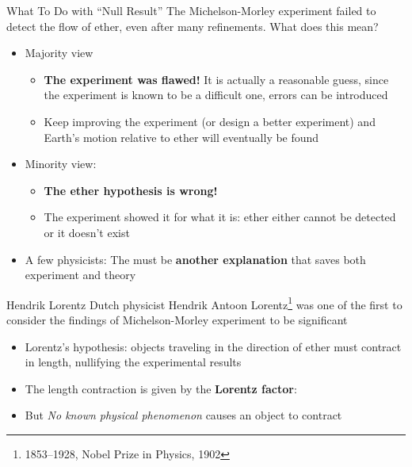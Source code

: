 \documentclass[12pt,compress,aspectratio=169]{beamer}
\newcommand{\pic}[2]{\texttt{[image: \#2]}}
\newcommand{\bigsqrt}{\ensuremath\sqrt{1-\left(\frac{v}{c}\right)^2}}
\newcommand{\lorentz}{\ensuremath\frac{1}{\bigsqrt}}
\newcommand{\eq}[2]{\vspace{#1}{\Large\begin{displaymath}#2\end{displaymath}}}
\begin{document}
\begin{frame}{What To Do with ``Null Result''}
  The Michelson-Morley experiment failed to detect the flow of ether, even
  after many refinements. What does this mean?
  \begin{itemize}
  \item Majority view
    \begin{itemize}
    \item\textbf{The experiment was flawed!} It is actually a reasonable
      guess, since the experiment is known to be a difficult one, errors can
      be introduced
    \item Keep improving the experiment (or design a better experiment) and
      Earth's motion relative to ether will eventually be found
    \end{itemize}
  \item Minority view:
    \begin{itemize}
    \item\textbf{The ether hypothesis is wrong!}
    \item The experiment showed it for what it is: ether either cannot be
      detected or it doesn't exist
    \end{itemize}
  \item A few physicists: The must be \textbf{another explanation} that saves
    both experiment and theory
  \end{itemize}
\end{frame}



\begin{frame}{Hendrik Lorentz}
%    
%    
  Dutch physicist Hendrik Antoon Lorentz\footnote{1853--1928, Nobel Prize in
    Physics, 1902} was one of the first to consider the findings of
  Michelson-Morley experiment to be significant
  \begin{itemize}
  \item Lorentz's hypothesis: objects traveling in the direction of ether must
    contract in length, nullifying the experimental results
  \item The length contraction is given by the \textbf{Lorentz factor}:
    
    \eq{-.2in}{
      \boxed{\gamma=\lorentz}
    }
  \item But \emph{No known physical phenomenon} causes an object to contract
  \end{itemize}
\end{frame}
\end{document}
